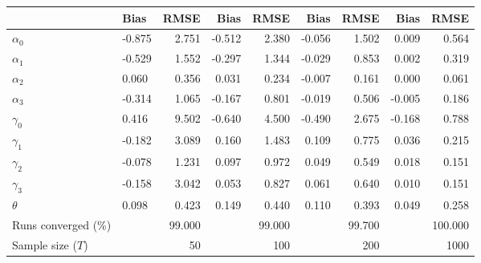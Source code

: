 
\begin{tabular}[t]{llrrrrrrr}
\toprule
  & Bias & RMSE & Bias & RMSE & Bias & RMSE & Bias & RMSE\\
\midrule
$\alpha_{0}$ & -0.875 & 2.751 & -0.512 & 2.380 & -0.056 & 1.502 & 0.009 & 0.564\\
$\alpha_{1}$ & -0.529 & 1.552 & -0.297 & 1.344 & -0.029 & 0.853 & 0.002 & 0.319\\
$\alpha_{2}$ & 0.060 & 0.356 & 0.031 & 0.234 & -0.007 & 0.161 & 0.000 & 0.061\\
$\alpha_{3}$ & -0.314 & 1.065 & -0.167 & 0.801 & -0.019 & 0.506 & -0.005 & 0.186\\
$\gamma_{0}$ & 0.416 & 9.502 & -0.640 & 4.500 & -0.490 & 2.675 & -0.168 & 0.788\\
$\gamma_{1}$ & -0.182 & 3.089 & 0.160 & 1.483 & 0.109 & 0.775 & 0.036 & 0.215\\
$\gamma_{2}$ & -0.078 & 1.231 & 0.097 & 0.972 & 0.049 & 0.549 & 0.018 & 0.151\\
$\gamma_{3}$ & -0.158 & 3.042 & 0.053 & 0.827 & 0.061 & 0.640 & 0.010 & 0.151\\
$\theta$ & 0.098 & 0.423 & 0.149 & 0.440 & 0.110 & 0.393 & 0.049 & 0.258\\
Runs converged (\%) &  & 99.000 &  & 99.000 &  & 99.700 &  & 100.000\\
Sample size ($T$) &  & 50 &  & 100 &  & 200 &  & 1000\\
\bottomrule
\end{tabular}
